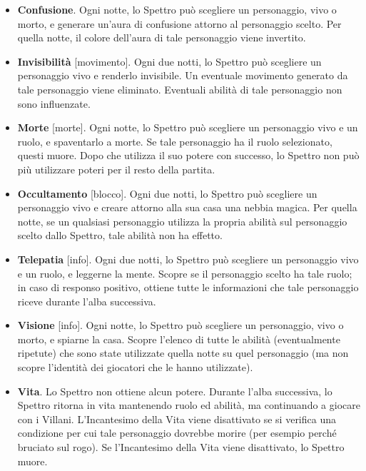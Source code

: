 \documentclass[a4paper,10pt]{article}
\begin{document}
\begin{itemize}


      \item {\bf Confusione}. Ogni notte, lo Spettro può scegliere un personaggio, vivo o morto, e generare un'aura di confusione attorno al personaggio scelto. Per quella notte, il colore dell'aura di tale personaggio viene invertito.

      \item {\bf Invisibilità} [movimento]. Ogni due notti, lo Spettro può scegliere un personaggio vivo e renderlo invisibile. Un eventuale movimento generato da tale personaggio viene eliminato. Eventuali abilità di tale personaggio non sono influenzate.

      \item {\bf Morte} [morte]. Ogni notte, lo Spettro può scegliere un personaggio vivo e un ruolo, e spaventarlo a morte. Se tale personaggio ha il ruolo selezionato, questi muore. Dopo che utilizza il suo potere con successo, lo Spettro non può più utilizzare poteri per il resto della partita.

      \item {\bf Occultamento} [blocco]. Ogni due notti, lo Spettro può scegliere un personaggio vivo e creare attorno alla sua casa una nebbia magica. Per quella notte, se un qualsiasi personaggio utilizza la propria abilità sul personaggio scelto dallo Spettro, tale abilità non ha effetto.

      \item {\bf Telepatia} [info]. Ogni due notti, lo Spettro può scegliere un personaggio vivo e un ruolo, e leggerne la mente. Scopre se il personaggio scelto ha tale ruolo; in caso di responso positivo, ottiene tutte le informazioni che tale personaggio riceve durante l'alba successiva.

      \item {\bf Visione} [info]. Ogni notte, lo Spettro può scegliere un personaggio, vivo o morto, e spiarne la casa. Scopre l'elenco di tutte le abilità (eventualmente ripetute) che sono state utilizzate quella notte su quel personaggio (ma non scopre l'identità dei giocatori che le hanno utilizzate).

      \item {\bf Vita}. Lo Spettro non ottiene alcun potere. Durante l'alba successiva, lo Spettro ritorna in vita mantenendo ruolo ed abilità, ma continuando a giocare con i Villani. L'Incantesimo della Vita viene disattivato se si verifica una condizione per cui tale personaggio dovrebbe morire (per esempio perché bruciato sul rogo). Se l'Incantesimo della Vita viene disattivato, lo Spettro muore.

\end{itemize}
\end{document}
